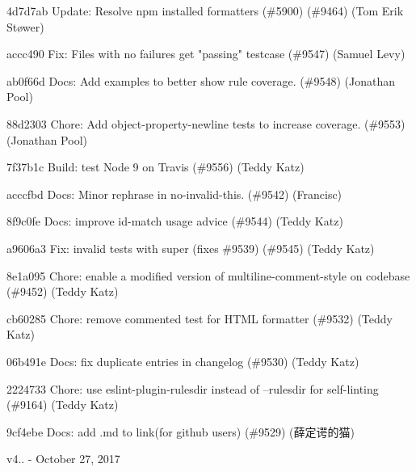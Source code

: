 \begin{DoxyItemize}
\item 4d7d7ab Update\+: Resolve npm installed formatters (\#5900) (\#9464) (Tom Erik Støwer)
\item accc490 Fix\+: Files with no failures get "{}passing"{} testcase (\#9547) (Samuel Levy)
\item ab0f66d Docs\+: Add examples to better show rule coverage. (\#9548) (Jonathan Pool)
\item 88d2303 Chore\+: Add object-\/property-\/newline tests to increase coverage. (\#9553) (Jonathan Pool)
\item 7f37b1c Build\+: test Node 9 on Travis (\#9556) (Teddy Katz)
\item acccfbd Docs\+: Minor rephrase in {\ttfamily no-\/invalid-\/this}. (\#9542) (Francisc)
\item 8f9c0fe Docs\+: improve id-\/match usage advice (\#9544) (Teddy Katz)
\item a9606a3 Fix\+: invalid tests with super (fixes \#9539) (\#9545) (Teddy Katz)
\item 8e1a095 Chore\+: enable a modified version of multiline-\/comment-\/style on codebase (\#9452) (Teddy Katz)
\item cb60285 Chore\+: remove commented test for HTML formatter (\#9532) (Teddy Katz)
\item 06b491e Docs\+: fix duplicate entries in changelog (\#9530) (Teddy Katz)
\item 2224733 Chore\+: use eslint-\/plugin-\/rulesdir instead of --rulesdir for self-\/linting (\#9164) (Teddy Katz)
\item 9cf4ebe Docs\+: add .md to link(for github users) (\#9529) (薛定谔的猫)
\end{DoxyItemize}

v4.. -\/ October 27, 2017


